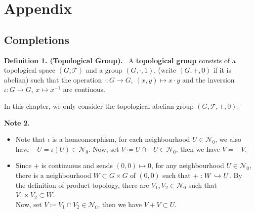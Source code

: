 \documentclass[12pt,a4paper,footinclude=true,headinclude=true]{scrbook} %
\newenvironment{definition}[2][Definition]
    { \begin{mdframed}[backgroundcolor=gray!20] \textbf{#1 #2.}\ }
    {  \end{mdframed}}
\newenvironment{nt}[2][Note]
    { \begin{mdframed}[backgroundcolor=gray!20] \textbf{#1 #2.} }
    {  \end{mdframed}}
\begin{document}
%	
\appendix
\cleardoublepage\part{Appendix}

\chapter{Completions}
\begin{definition}{1. (Topological Group)}
    \newline A \textbf{topological group} consists of a topological space $(G,\mathcal{T})$ and a group $(G,\cdot,1)$, (write $(G,+,0)$ if it is abelian) such that the operation $\cdot:G\to G,\ (x,y)\mapsto x\cdot y$ and the inversion $\iota:G\to G,\ x\mapsto x^{-1}$ are contiuous.
\end{definition}

In this chapter, we only consider the topological abelian group $(G,\mathcal{T},+,0)$:
\begin{nt}{2}
    \begin{itemize}
        \item[(a)] Note that $\iota$ is a homeomorphism, for each neighbourhood $U\in\mathcal{N}_0$, we also have $-U=\iota(U)\in\mathcal{N}_0$. Now, set $V\coloneqq U\cap-U\in\mathcal{N}_0$, then we have $V=-V$.
        \item[(b)] Since $+$ is continuous and sends $(0,0)\mapsto0$, for any neighbourhood $U\in\mathcal{N}_0$, there is a neighbourhood $W\subset G\times G$ of $(0,0)$ such that $+:W\xhookrightarrow{} U$. By the definition of product topology, there are $V_1,V_2\in\mathcal{N}_0$ such that $V_1\times V_2\subset W$.\\ Now, set $V\coloneqq V_1\cap V_2\in\mathcal{N}_0$, then we have $V+V\subset U$.
    \end{itemize}
\end{nt}
\end{document}
